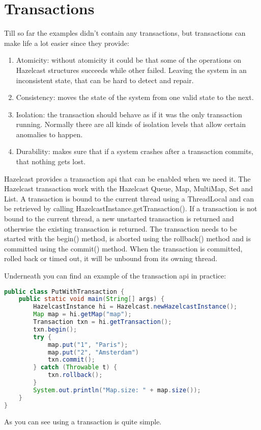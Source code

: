 \chapter{Transactions}
Till so far the examples didn't contain any transactions, but transactions can make life a lot easier since they provide:
\begin{enumerate}
\item Atomicity: without atomicity it could be that some of the operations on Hazelcast structures succeeds while other failed. Leaving the system in an inconsistent state, that can be hard to detect and repair.
\item Consistency: moves the state of the system from one valid state to the next.
\item Isolation: the transaction should behave as if it was the only transaction running. Normally there are all kinds of isolation levels that allow certain anomalies to happen.
\item Durability: makes sure that if a system crashes after a transaction commits, that nothing gets lost. 
\end{enumerate}
Hazelcast provides a transaction api that can be enabled when we need it. The Hazelcast transaction work with the Hazelcast Queue, Map, MultiMap, Set and List. A transaction is bound to the current thread using a ThreadLocal and can be retrieved by calling HazelcastInstance.getTransaction(). If a transaction is not bound to the current thread, a new unstarted transaction is returned and otherwise the existing transaction is returned. The transaction needs to be started with the begin() method, is aborted using the rollback() method and is committed using the commit() method. When the transaction is committed, rolled back or timed out, it will be unbound from its owning thread.

Underneath you can find an example of the transaction api in practice:
\begin{lstlisting}[language=java]
public class PutWithTransaction {
    public static void main(String[] args) {
        HazelcastInstance hi = Hazelcast.newHazelcastInstance();
        Map map = hi.getMap("map");
        Transaction txn = hi.getTransaction();
        txn.begin();
        try {
            map.put("1", "Paris");
            map.put("2", "Amsterdam")
            txn.commit();
        } catch (Throwable t) {
            txn.rollback();
        }
        System.out.println("Map.size: " + map.size());
    }
}
\end{lstlisting}
As you can see using a transaction is quite simple.

